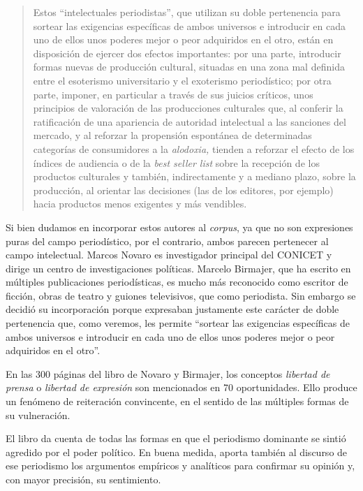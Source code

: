 \begin{quote}
Estos ``intelectuales periodistas'', que utilizan su doble pertenencia para sortear las exigencias específicas de ambos universos e introducir en cada uno de ellos unos poderes mejor o peor adquiridos en el otro, están en disposición de ejercer dos efectos importantes: por una parte, introducir formas nuevas de producción cultural, situadas en una zona mal definida entre el esoterismo universitario y el exoterismo periodístico; por otra parte, imponer, en particular a través de sus juicios críticos, unos principios de valoración de las producciones culturales que, al conferir la ratificación de una apariencia de autoridad intelectual a las sanciones del mercado, y al reforzar la propensión espontánea de determinadas categorías de consumidores a la \emph{alodoxia,} tienden a reforzar el efecto de los índices de audiencia o de la \emph{best seller list} sobre la recepción de los productos culturales y también, indirectamente y a mediano plazo, sobre la producción, al orientar las decisiones (las de los editores, por ejemplo) hacia productos menos exigentes y más vendibles.
\end{quote}

Si bien dudamos en incorporar estos autores al \emph{corpus}, ya que no son expresiones puras del campo periodístico, por el contrario, ambos parecen pertenecer al campo intelectual. Marcos Novaro es investigador principal del CONICET y dirige un centro de investigaciones políticas. Marcelo Birmajer, que ha escrito en múltiples publicaciones periodísticas, es mucho más reconocido como escritor de ficción, obras de teatro y guiones televisivos, que como periodista. Sin embargo se decidió su incorporación porque expresaban justamente este carácter de doble pertenencia que, como veremos, les permite  ``sortear las exigencias específicas de ambos universos e introducir en cada uno de ellos unos poderes mejor o peor adquiridos en el otro''.

En las 300 páginas del libro de Novaro y Birmajer, los conceptos \emph{libertad de prensa} o \emph{libertad de expresión} son mencionados en 70 oportunidades. Ello produce un fenómeno de reiteración convincente, en el sentido de las múltiples formas de su vulneración.

El libro da cuenta de todas las formas en que el periodismo dominante se sintió agredido por el poder político. En buena medida, aporta también al discurso de ese periodismo los argumentos empíricos y analíticos para confirmar su opinión y, con mayor precisión, su sentimiento.

